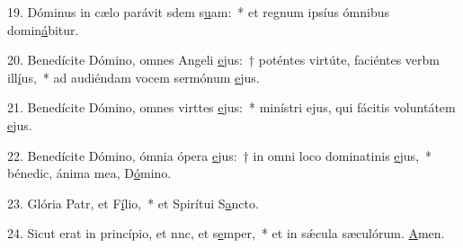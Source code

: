 19. Dóminus in cælo parávit sdem s\uline{u}am:~* et regnum ipsíus ómnibus domin\uline{á}bitur.\par 
20. Benedícite Dómino, omnes Angeli \uline{e}jus:~† poténtes virtúte, faciéntes verbm ill\uline{í}us,~* ad audiéndam vocem sermónum \uline{e}jus.\par 
21. Benedícite Dómino, omnes virttes \uline{e}jus:~* minístri ejus, qui fácitis voluntátem \uline{e}jus.\par 
22. Benedícite Dómino, ómnia ópera \uline{e}jus:~† in omni loco dominatinis \uline{e}jus,~* bénedic, ánima mea, D\uline{ó}mino.\par 
23. Glória Patr, et F\uline{í}lio,~* et Spirítui S\uline{a}ncto.\par 
24. Sicut erat in princípio, et nnc, et s\uline{e}mper,~* et in sǽcula sæculórum. \uline{A}men.\par 
